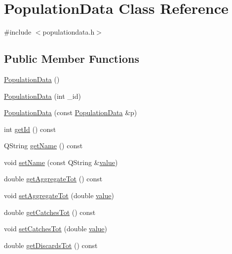 \hypertarget{class_population_data}{}\section{Population\+Data Class Reference}
\label{class_population_data}


{\ttfamily \#include $<$populationdata.\+h$>$}

\subsection*{Public Member Functions}
\begin{DoxyCompactItemize}
\item 
\mbox{\hyperlink{class_population_data_a10bd0ee1649e75daa722a67f3c402b4f}{Population\+Data}} ()
\item 
\mbox{\hyperlink{class_population_data_ada60ea1450e8207a9dd8ce5c6b2623e7}{Population\+Data}} (int \+\_\+id)
\item 
\mbox{\hyperlink{class_population_data_a67f185a01ad647cd78af1abe894931ed}{Population\+Data}} (const \mbox{\hyperlink{class_population_data}{Population\+Data}} \&p)
\item 
int \mbox{\hyperlink{class_population_data_ae90cbce9e2df739c6e1a5d1b7a9a6edb}{get\+Id}} () const
\item 
Q\+String \mbox{\hyperlink{class_population_data_a9e80a36a4d2c64bc3fcd08fae4f88f9e}{get\+Name}} () const
\item 
void \mbox{\hyperlink{class_population_data_ad0009e0d4edef58bad23be7162e245a8}{set\+Name}} (const Q\+String \&\mbox{\hyperlink{diffusion_8cpp_a4b41795815d9f3d03abfc739e666d5da}{value}})
\item 
double \mbox{\hyperlink{class_population_data_a456f5b61c898188a80c6a4eef8d46f5c}{get\+Aggregate\+Tot}} () const
\item 
void \mbox{\hyperlink{class_population_data_a04ea0c31603277770a60338ecae4556a}{set\+Aggregate\+Tot}} (double \mbox{\hyperlink{diffusion_8cpp_a4b41795815d9f3d03abfc739e666d5da}{value}})
\item 
double \mbox{\hyperlink{class_population_data_ad332b43861c5fe6a0c8a43e1205f305a}{get\+Catches\+Tot}} () const
\item 
void \mbox{\hyperlink{class_population_data_a5f01ee87530a2a97879a240bf324cd12}{set\+Catches\+Tot}} (double \mbox{\hyperlink{diffusion_8cpp_a4b41795815d9f3d03abfc739e666d5da}{value}})
\item 
double \mbox{\hyperlink{class_population_data_a5c8ac4309d73dc95ccf736262165fa55}{get\+Discards\+Tot}} () const

\end{DoxyCompactItemize}
